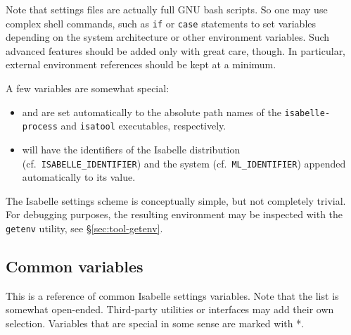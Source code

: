 Note that settings files are actually full GNU bash scripts. So one may use
complex shell commands, such as \texttt{if} or \texttt{case} statements to set
variables depending on the system architecture or other environment variables.
Such advanced features should be added only with great care, though. In
particular, external environment references should be kept at a minimum.

\medskip A few variables are somewhat special:
\begin{itemize}
\item {} and  are set automatically to the
  absolute path names of the \texttt{isabelle-process} and \texttt{isatool}
  executables, respectively.
  
\item {} will have the identifiers of the
  Isabelle distribution (cf.\ \texttt{ISABELLE_IDENTIFIER}) and the
  {\ML} system (cf.\ \texttt{ML_IDENTIFIER}) appended automatically to
  its value.
\end{itemize}

\medskip The Isabelle settings scheme is conceptually simple, but not
completely trivial.  For debugging purposes, the resulting environment may be
inspected with the \texttt{getenv} utility, see \S\ref{sec:tool-getenv}.


\subsection{Common variables}

This is a reference of common Isabelle settings variables. Note that the list
is somewhat open-ended. Third-party utilities or interfaces may add their own
selection. Variables that are special in some sense are marked with *.

